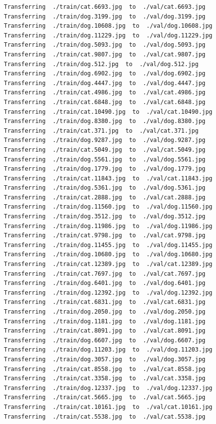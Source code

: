 \documentclass[]{book}
\theoremstyle{definition}
\theoremstyle{definition}
\theoremstyle{definition}
\theoremstyle{remark}
\begin{document}
\begin{verbatim}
Transferring  ./train/cat.6693.jpg  to  ./val/cat.6693.jpg
Transferring  ./train/dog.3199.jpg  to  ./val/dog.3199.jpg
Transferring  ./train/dog.10608.jpg  to  ./val/dog.10608.jpg
Transferring  ./train/dog.11229.jpg  to  ./val/dog.11229.jpg
Transferring  ./train/dog.5093.jpg  to  ./val/dog.5093.jpg
Transferring  ./train/cat.9807.jpg  to  ./val/cat.9807.jpg
Transferring  ./train/dog.512.jpg  to  ./val/dog.512.jpg
Transferring  ./train/dog.6902.jpg  to  ./val/dog.6902.jpg
Transferring  ./train/dog.4447.jpg  to  ./val/dog.4447.jpg
Transferring  ./train/cat.4986.jpg  to  ./val/cat.4986.jpg
Transferring  ./train/cat.6848.jpg  to  ./val/cat.6848.jpg
Transferring  ./train/cat.10490.jpg  to  ./val/cat.10490.jpg
Transferring  ./train/dog.8380.jpg  to  ./val/dog.8380.jpg
Transferring  ./train/cat.371.jpg  to  ./val/cat.371.jpg
Transferring  ./train/dog.9287.jpg  to  ./val/dog.9287.jpg
Transferring  ./train/cat.5049.jpg  to  ./val/cat.5049.jpg
Transferring  ./train/dog.5561.jpg  to  ./val/dog.5561.jpg
Transferring  ./train/dog.1779.jpg  to  ./val/dog.1779.jpg
Transferring  ./train/cat.11843.jpg  to  ./val/cat.11843.jpg
Transferring  ./train/dog.5361.jpg  to  ./val/dog.5361.jpg
Transferring  ./train/cat.2888.jpg  to  ./val/cat.2888.jpg
Transferring  ./train/dog.11560.jpg  to  ./val/dog.11560.jpg
Transferring  ./train/dog.3512.jpg  to  ./val/dog.3512.jpg
Transferring  ./train/dog.11986.jpg  to  ./val/dog.11986.jpg
Transferring  ./train/cat.9798.jpg  to  ./val/cat.9798.jpg
Transferring  ./train/dog.11455.jpg  to  ./val/dog.11455.jpg
Transferring  ./train/dog.10680.jpg  to  ./val/dog.10680.jpg
Transferring  ./train/cat.12389.jpg  to  ./val/cat.12389.jpg
Transferring  ./train/cat.7697.jpg  to  ./val/cat.7697.jpg
Transferring  ./train/dog.6401.jpg  to  ./val/dog.6401.jpg
Transferring  ./train/dog.12392.jpg  to  ./val/dog.12392.jpg
Transferring  ./train/cat.6831.jpg  to  ./val/cat.6831.jpg
Transferring  ./train/dog.2050.jpg  to  ./val/dog.2050.jpg
Transferring  ./train/dog.1181.jpg  to  ./val/dog.1181.jpg
Transferring  ./train/cat.8091.jpg  to  ./val/cat.8091.jpg
Transferring  ./train/dog.6607.jpg  to  ./val/dog.6607.jpg
Transferring  ./train/dog.11203.jpg  to  ./val/dog.11203.jpg
Transferring  ./train/dog.3057.jpg  to  ./val/dog.3057.jpg
Transferring  ./train/cat.8558.jpg  to  ./val/cat.8558.jpg
Transferring  ./train/cat.3358.jpg  to  ./val/cat.3358.jpg
Transferring  ./train/dog.12337.jpg  to  ./val/dog.12337.jpg
Transferring  ./train/cat.5665.jpg  to  ./val/cat.5665.jpg
Transferring  ./train/cat.10161.jpg  to  ./val/cat.10161.jpg
Transferring  ./train/cat.5538.jpg  to  ./val/cat.5538.jpg

\end{verbatim}
\end{document}
